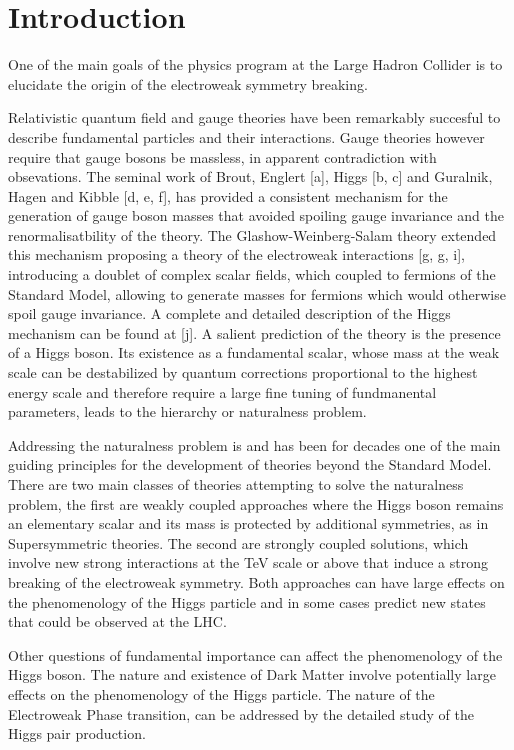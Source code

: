 \documentclass[../report.tex]{subfiles}
\begin{document}
\section{Introduction}


One of the main goals of the physics program at the Large Hadron
Collider is to elucidate the origin of the electroweak symmetry
breaking.

Relativistic quantum field and gauge theories have been remarkably
succesful to describe fundamental particles and their
interactions. Gauge theories however require that gauge bosons be
massless, in apparent contradiction with obsevations. The seminal work
of Brout, Englert [a], Higgs [b, c] and Guralnik, Hagen and Kibble
[d, e, f], has provided a consistent mechanism for the generation
of gauge boson masses that avoided spoiling gauge invariance and the
renormalisatbility of the theory. The Glashow-Weinberg-Salam theory
extended this mechanism proposing a theory of the electroweak
interactions [g, g, i], introducing a doublet of complex scalar
fields, which coupled to fermions of the Standard Model, allowing to
generate masses for fermions which would otherwise spoil gauge
invariance. A complete and detailed description of the Higgs mechanism
can be found at [j]. A salient prediction of the theory is the
presence of a Higgs boson. Its existence as a fundamental scalar,
whose mass at the weak scale can be destabilized by quantum
corrections proportional to the highest energy scale and therefore
require a large fine tuning of fundmanental parameters, leads to the
hierarchy or naturalness problem.

Addressing the naturalness problem is and has been for decades one of
the main guiding principles for the development of theories beyond the
Standard Model. There are two main classes of theories attempting
to solve the naturalness problem, the first are weakly coupled approaches 
where the Higgs boson
remains an elementary scalar and its mass is protected by additional
symmetries, as in Supersymmetric theories. The second are strongly
coupled solutions, which involve new strong interactions at the TeV
scale or above that induce a strong breaking of the electroweak
symmetry. Both approaches can have large effects on the phenomenology
of the Higgs particle and in some cases predict new states that could be 
observed at the LHC.

Other questions of fundamental importance can affect the phenomenology
of the Higgs boson. The nature and existence of Dark Matter involve
potentially large effects on the phenomenology of the Higgs
particle. The nature of the Electroweak Phase transition, can be
addressed by the detailed study of the Higgs pair production. 
\end{document}
